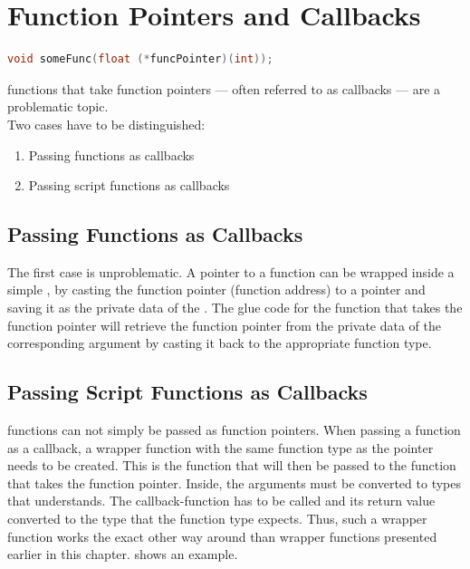 \section{Function Pointers and Callbacks}

\SingleSpacing
\begin{lstlisting}[language=C++, caption=\myProperName{C++} function that takes a function pointer]
void someFunc(float (*funcPointer)(int));
\end{lstlisting}
\OnehalfSpacing

 functions that take function pointers --- often referred to as callbacks --- are a problematic topic.\\
Two cases have to be distinguished:
\begin{enumerate}
\item Passing  functions as callbacks
\item Passing script functions as callbacks
\end{enumerate}

\subsection{Passing  Functions as Callbacks}

The first case is unproblematic. A pointer to a  function can be wrapped inside a simple , by casting the function pointer (function address) to a  pointer and saving it as the private data of the . The glue code for the function that takes the function pointer will retrieve the function pointer from the private data of the corresponding argument by casting it back to the appropriate function type.

\subsection{Passing Script Functions as Callbacks}

 functions can not simply be passed as  function pointers. When passing a  function as a callback, a wrapper function with the same function type as the pointer needs to be created. This is the  function that will then be passed to the function that takes the function pointer. Inside, the  arguments must be converted to types that  understands. The  callback-function has to be called and its return value converted to the  type that the function type expects. Thus, such a wrapper function works the exact other way around than wrapper functions presented earlier in this chapter.  shows an example.

